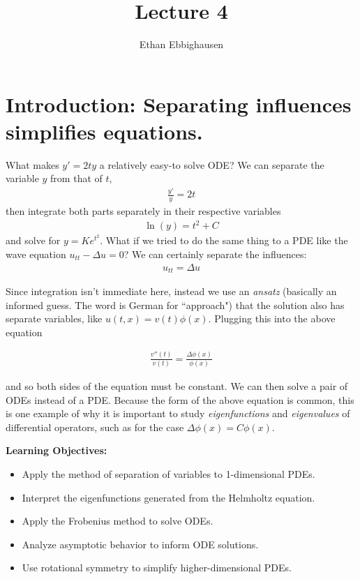 \documentclass{article}
\title{Lecture 4}
\author{Ethan Ebbighausen}
\begin{document}
	\pagestyle{fancy}
	\fancyfoot{} 
	
	\maketitle
	
	\section{Introduction: Separating influences simplifies equations.}
	
	What makes $y' = 2ty$ a relatively easy-to solve ODE? We can separate the variable $y$ from that of $t$, 
	\begin{align*}
		\frac{y'}{y} = 2t
	\end{align*}
	then integrate both parts separately in their respective variables
	\begin{align*}
		\ln(y) = t^{2} + C
	\end{align*}
	and solve for $y = K e^{t^2}$. What if we tried to do the same thing to a PDE like the wave equation $u_{tt} - \Delta u = 0$? We can certainly separate the influences:
	\begin{align*}
		u_{tt} = \Delta u
	\end{align*}
	
	Since integration isn't immediate here, instead we use an \textit{ansatz} (basically an informed guess. The word is German for ``approach") that the solution also has separate variables, like $u(t,x) = v(t)\phi(x)$. Plugging this into the above equation
	
	\begin{align*}
		\frac{v''(t)}{v(t)} = \frac{\Delta \phi(x)}{\phi(x)} 
	\end{align*}
	
	and so both sides of the equation must be constant. We can then solve a pair of ODEs instead of a PDE. Because the form of the above equation is common, this is one example of why it is important to study \textit{eigenfunctions} and \textit{eigenvalues} of differential operators, such as for the case $\Delta \phi(x) = C \phi(x)$. 
	
	
	\textbf{Learning Objectives:}
	
	\begin{itemize}
		\item Apply the method of separation of variables to 1-dimensional PDEs.
		\item Interpret the eigenfunctions generated from the Helmholtz equation. 
		\item Apply the Frobenius method to solve ODEs.
		\item Analyze asymptotic behavior to inform ODE solutions. 
		\item Use rotational symmetry to simplify higher-dimensional PDEs.
	\end{itemize}
	
\end{document}
